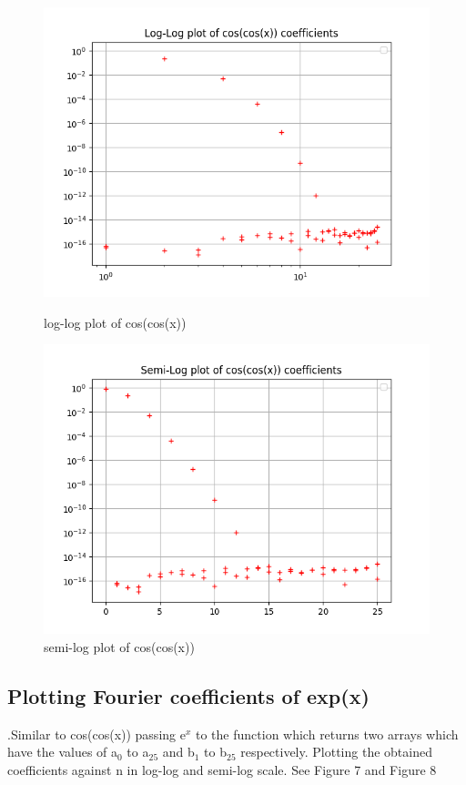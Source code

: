 \documentclass[a4paper]{article}
\begin{document}
\begin{figure}
\includegraphics[width=\columnwidth]{coeffllcoscos.png}
\caption{log-log plot of cos(cos(x))}
\includegraphics[width=\columnwidth]{coeffslcoscos.png}
\caption{semi-log plot of cos(cos(x))}
\end{figure}
\subsection{Plotting Fourier coefficients of exp(x)}
.Similar to cos(cos(x)) passing e$^{x}$ to the function which returns two arrays which have the values of a$_{0}$ to a$_{25}$ and b$_{1}$ to b$_{25}$ respectively. Plotting the obtained coefficients against n in log-log and semi-log scale. See Figure 7 and Figure 8
\end{document}

